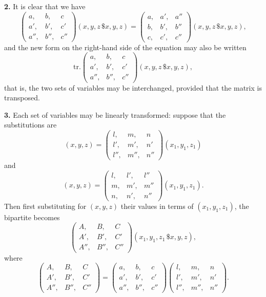 \documentclass[12pt,a4paper]{article}
\theoremstyle{definition}
\begin{document}
\medskip
\noindent\textbf{2.} It is clear that we have
\[
\begin{pmatrix} a, & b, & c \\ a', & b', & c' \\ a'', & b'', & c'' \end{pmatrix}(x,y,z\,\$x,y,z)
= \begin{pmatrix} a, & a', & a'' \\ b, & b', & b'' \\ c, & c', & c'' \end{pmatrix}(x,y,z\,\$x,y,z),
\]
and the new form on the right-hand side of the equation may also be written
\[\text{tr.}\begin{pmatrix} a, & b, & c \\ a', & b', & c' \\ a'', & b'', & c'' \end{pmatrix}(x,y,z\,\$x,y,z),\]
that is, the two sets of variables may be interchanged, provided that the matrix is transposed.

\medskip
\noindent\textbf{3.} Each set of variables may be linearly transformed: suppose that the substitutions are
\[
(x,y,z) = \begin{pmatrix} l, & m, & n \\ l', & m', & n' \\ l'', & m'', & n'' \end{pmatrix}(x_1,y_1,z_1)
\]
and
\[
(x,y,z) = \begin{pmatrix} l, & l', & l'' \\ m, & m', & m'' \\ n, & n', & n'' \end{pmatrix}(x_1,y_1,z_1).
\]
Then first substituting for $(x,y,z)$ their values in terms of $(x_1,y_1,z_1)$, the bipartite becomes
\[
\begin{pmatrix} A, & B, & C \\ A', & B', & C' \\ A'', & B'', & C'' \end{pmatrix}(x_1,y_1,z_1\,\$x,y,z),
\]
where
\[
\begin{pmatrix} A, & B, & C \\ A', & B', & C' \\ A'', & B'', & C'' \end{pmatrix}
= \begin{pmatrix} a, & b, & c \\ a', & b', & c' \\ a'', & b'', & c'' \end{pmatrix}
\begin{pmatrix} l, & m, & n \\ l', & m', & n' \\ l'', & m'', & n'' \end{pmatrix}.
\]
\end{document}
